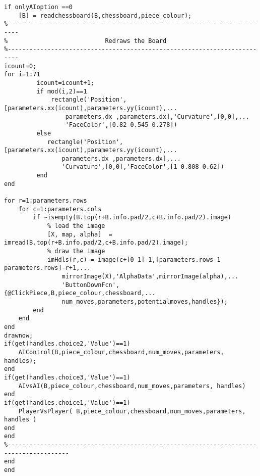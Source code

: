 \documentclass{article}
\begin{document}
\begin{lstlisting}
if onlyAIoption ==0
    [B] = readchessboard(B,chessboard,piece_colour);
%-------------------------------------------------------------------------
%                           Redraws the Board
%-------------------------------------------------------------------------
icount=0;
for i=1:71
         icount=icount+1;
         if mod(i,2)==1
             rectangle('Position',[parameters.xx(icount),parameters.yy(icount),...
                 parameters.dx ,parameters.dx],'Curvature',[0,0],...
                 'FaceColor',[0.82 0.545 0.278])
         else
            rectangle('Position',[parameters.xx(icount),parameters.yy(icount),...
                parameters.dx ,parameters.dx],...
                'Curvature',[0,0],'FaceColor',[1 0.808 0.62])             
         end
end

for r=1:parameters.rows
    for c=1:parameters.cols
        if ~isempty(B.top(r+B.info.pad/2,c+B.info.pad/2).image)
            % load the image
            [X, map, alpha]  = imread(B.top(r+B.info.pad/2,c+B.info.pad/2).image);
            % draw the image
            imHdls(r,c) = image(c+[0 1]-1,[parameters.rows-1 parameters.rows]-r+1,...
                mirrorImage(X),'AlphaData',mirrorImage(alpha),...
                'ButtonDownFcn',{@ClickPiece,B,piece_colour,chessboard,...
                num_moves,parameters,potentialmoves,handles});
        end
    end
end
drawnow;
if(get(handles.choice2,'Value')==1)
    AIControl(B,piece_colour,chessboard,num_moves,parameters, handles);
end
if(get(handles.choice3,'Value')==1)
    AIvsAI(B,piece_colour,chessboard,num_moves,parameters, handles)
end
if(get(handles.choice1,'Value')==1)
    PlayerVsPlayer( B,piece_colour,chessboard,num_moves,parameters, handles )
end
end
%---------------------------------------------------------------------------------------
end
end
\end{lstlisting}
\end{document}
